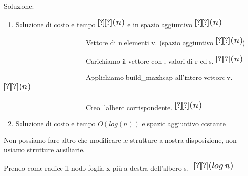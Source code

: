 \documentclass{article}
\providecommand{\tightlist}{%
  \setlength{\itemsep}{0pt}\setlength{\parskip}{0pt}}
\begin{document}
{{}

{Soluzione}{:}

\begin{enumerate}
\tightlist
\item
  {Soluzione di costo e tempo }\includegraphics{images/image149.png}{~e in spazio aggiuntivo }\includegraphics{images/image149.png}
\end{enumerate}

{}

{~~~~~~~~~~~~~~~~~~~~~~~~Vettore di n elementi v. (spazio aggiuntivo
}\includegraphics{images/image149.png}{)}

{~~~~~~~~~~~~~~~~~~~~~~~~Carichiamo il vettore con i valori di r ed s.
}\includegraphics{images/image149.png}

{~~~~~~~~~~~~~~~~~~~~~~~~Applichiamo build\_maxheap all'intero vettore
v.}\includegraphics{images/image149.png}

{~~~~~~~~~~~~~~~~~~~~~~~~Creo l'albero corrispondente.
}\includegraphics{images/image149.png}

{}

\begin{enumerate}
\setcounter{enumi}{1}
\tightlist
\item
  {Soluzione di costo e tempo $O(log(n))$ e spazio aggiuntivo costante}
\end{enumerate}

{Non possiamo fare altro che modificare le strutture a nostra disposizione, non usiamo strutture ausiliarie.}

{}

{Prendo come radice il nodo foglia x più a destra dell'albero s.
~}\includegraphics{images/image150.png}

}
\end{document}

